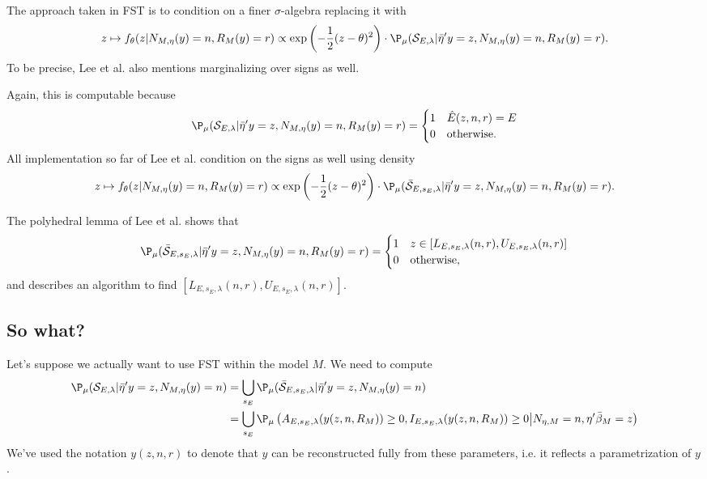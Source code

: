 \documentclass{article}
\newcommand{\OLS}{\bar{\beta}}
\begin{document}
        The approach taken in FST is to condition on a finer
        $\sigma$-algebra replacing it with
        \begin{equation}
          \label{eq:selective:density:FST}
        z \mapsto f_{\theta}(z | N_{M,\eta}(y)=n, R_M(y)=r) \propto
        \exp \left(-\frac{1}{2}(z-\theta)^2 \right) \cdot
        \P_{\mu}({\cal S}_{E,\lambda} | \bar{\eta}'y=z, N_{M,\eta}(y)=n,
        R_M(y)=r).
        \end{equation}
        To be precise, Lee et al. also mentions marginalizing over
        signs as well.
        
        Again, this is computable because
        $$ \P_{\mu}({\cal S}_{E,\lambda} | \bar{\eta}'y=z, N_{M,\eta}(y)=n,
        R_M(y)=r) =
        \begin{cases}
          1 & \hat{E}(z,n,r)=E \\ 0 & \text{otherwise.}
          \end{cases}
        $$
        All implementation so far of Lee et al. condition on the signs as well using density
        \begin{equation}
          \label{eq:selective:density:FST}
        z \mapsto f_{\theta}(z | N_{M,\eta}(y)=n, R_M(y)=r) \propto
        \exp \left(-\frac{1}{2}(z-\theta)^2 \right) \cdot
        \P_{\mu}(\bar{\cal S}_{E,s_E,\lambda} | \bar{\eta}'y=z,
        N_{M,\eta}(y)=n, R_M(y)=r).
        \end{equation}

        The polyhedral lemma of Lee et al. shows that
        $$ \P_{\mu}(\bar{\cal S}_{E,s_E,\lambda} | \bar{\eta}'y=z,
        N_{M,\eta}(y)=n, R_M(y)=r) =
        \begin{cases}
          1 & z \in [L_{E,s_E,\lambda}(n,r), U_{E,s_E,\lambda}(n,r)] \\ 0 &
          \text{otherwise,}
          \end{cases}
        $$ and describes an algorithm to find $[L_{E,s_E,\lambda}(n,r),
          U_{E,s_E,\lambda}(n,r)] $.

        \subsection{So what?}

        Let's suppose we actually want to use FST within the model
        $M$.  We need to compute
        \begin{equation}
          \label{eq:selective:probability}
          \begin{aligned}
            \P_{\mu}({\cal S}_{E,\lambda} | \bar{\eta}'y=z, N_{M,\eta}(y)=n) &=
            \bigcup_{s_E} \P_{\mu}(\bar{\cal S}_{E,s_E,\lambda} | \bar{\eta}'y=z,
            N_{M,\eta}(y)=n) \\ &= \bigcup_{s_E} \P_{\mu}\left( A_{E,s_E,\lambda}(y(z,n,R_M)) \geq 0,
            I_{E,s_E,\lambda}(y(z,n,R_M)) \geq 0  \bigl | N_{\eta,M}=n, \eta'\OLS_M=z
            \right)
          \end{aligned}
          \end{equation}
        We've used the notation $y(z,n,r)$ to denote that $y$ can be
        reconstructed fully from these parameters, i.e. it reflects a
        parametrization of $y$.
        
\end{document}
